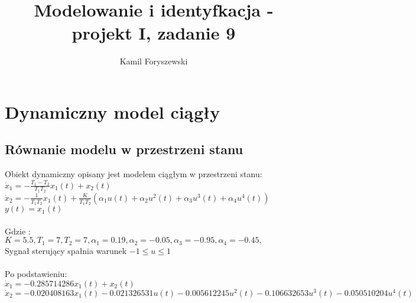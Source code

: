 \documentclass[a4paper, 11pt]{article}
\author{Kamil Foryszewski}
\title{Modelowanie i identyfkacja - projekt I, zadanie 9}
\begin{document}

\maketitle
\tableofcontents

\section{Dynamiczny model ciągły}
\subsection{Równanie modelu w przestrzeni stanu}
Obiekt dynamiczny opisany jest modelem ciągłym w przestrzeni stanu: 
\\

$\dot{x}_1 = -\frac{T_{1}-T_{2}}{T_{1}T_{2}}x_{1}(t) +x_{2}(t)$
\\

$\dot{x}_2 = -\frac{1}{T_{1}T_{2}}x_{1}(t) + \frac{K}{T_{1}T_{2}}(\alpha_{1}u(t) + \alpha_{2}u^2(t) + \alpha_{3}u^3(t) + \alpha_{4}u^4(t))$
\\

$y(t) = x_{1}(t)$
\\
\\
Gdzie : \\

$K  = 5.5, T_1 = 7, T_2 = 7, \alpha_1 = 0.19, \alpha_2 = -0.05, \alpha_3 = -0.95, \alpha_4 = -0.45,$
\\

Sygnał sterujący spałnia warunek $-1 \leq u \leq 1$
\\
\\
Po podstawieniu: 
\\

$\dot{x}_1 = -0.285714286x_{1}(t) +x_{2}(t)$
\\

$\dot{x}_2 = - 0.020408163x_{1}(t) - 0.021326531u(t) - 0.005612245u^2(t) - 0.106632653u^3(t) - 0.050510204u^4(t)$
\\
\end{document}
